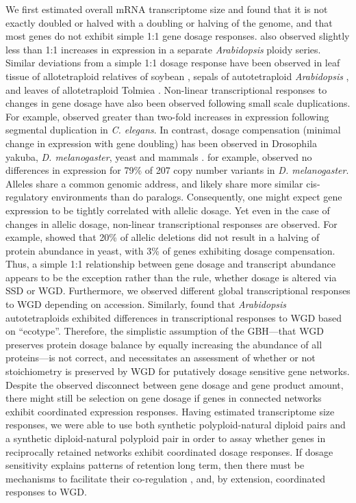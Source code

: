 \documentclass[11pt]{article}
\begin{document}
We first estimated overall mRNA transcriptome size and found that it is not exactly doubled or halved with a doubling or halving of the genome, and that most genes do not exhibit simple 1:1 gene dosage responses.
\cite{hou2018} also observed slightly less than 1:1 increases in expression in a separate \textit{Arabidopsis} ploidy series.
Similar deviations from a simple 1:1 dosage response have been observed in leaf tissue of allotetraploid relatives of soybean \citep{coate2010}, sepals of autotetraploid \textit{Arabidopsis} \citep{robinson2018}, and leaves of allotetraploid Tolmiea \citep{visger2019}.
Non-linear transcriptional responses to changes in gene dosage have also been observed following small scale duplications.
For example, \cite{konrad2018} observed greater than two-fold increases in expression following segmental duplication in \textit{C. elegans}.
In contrast, dosage compensation (minimal change in expression with gene doubling) has been observed in Drosophila yakuba, \textit{D. melanogaster}, yeast and mammals \citep{qian2010, rogers2017, zhou2011}.
\cite{zhou2011} for example, observed no differences in expression for 79\% of 207 copy number variants in \textit{D. melanogaster}.\\

Alleles share a common genomic address, and likely share more similar cis-regulatory environments than do paralogs.
Consequently, one might expect gene expression to be tightly correlated with allelic dosage.
Yet even in the case of changes in allelic dosage, non-linear transcriptional responses are observed.
For example, \cite{springer2010} showed that 20\% of allelic deletions did not result in a halving of protein abundance in yeast, with 3\% of genes exhibiting dosage compensation.
Thus, a simple 1:1 relationship between gene dosage and transcript abundance appears to be the exception rather than the rule, whether dosage is altered via SSD or WGD.
Furthermore, we observed different global transcriptional responses to WGD depending on accession.
Similarly, \cite{yu2010} found that \textit{Arabidopsis} autotetraploids exhibited differences in transcriptional responses to WGD based on ``ecotype''.
Therefore, the simplistic assumption of the GBH---that WGD preserves protein dosage balance by equally increasing the abundance of all proteins---is not correct, and necessitates an assessment of whether or not stoichiometry is preserved by WGD for putatively dosage sensitive gene networks.\\

Despite the observed disconnect between gene dosage and gene product amount, there might still be selection on gene dosage if genes in connected networks exhibit coordinated expression responses.
Having estimated transcriptome size responses, we were able to use both synthetic polyploid-natural diploid pairs and a synthetic diploid-natural polyploid pair in order to assay whether genes in reciprocally retained networks exhibit coordinated dosage responses.
If dosage sensitivity explains patterns of retention long term, then there must be mechanisms to facilitate their co-regulation \citep{papp2003}, and, by extension, coordinated responses to WGD.\\
\end{document}
